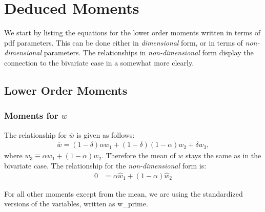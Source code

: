 \section{Deduced Moments}\label{sec:dedmoments}

We start by listing the equations for the lower order moments written in terms of \gls{pdf} parameters.
This can be done either in \emph{dimensional} form, or in terms of \emph{non-dimensional} parameters.
The relationships in \emph{non-dimensional} form display the connection to the bivariate case in a somewhat more clearly.

\subsection{Lower Order Moments}\label{subsec:lowerordermoments}

\subsubsection{Moments for $w$}\label{subsubsec:lowerordermoments_w}

The relationship for $\overline{w}$ is given as follows:
\begin{align}
    \label{eq:w_bar}
    \overline{w} = (1 - \delta) \alpha w_1 + (1 - \delta)(1-\alpha) w_2 + \delta w_3,
\end{align}
where $w_3 \equiv \alpha w_1 + (1 - \alpha) w_2$.
Therefore the mean of $w$ stays the same as in the bivariate case.
The relationship for the \emph{non-dimensional} form is:
\begin{align}
    \label{eq:w_bar_nondim}
    0 &= \alpha \widehat{w}_1 + (1 - \alpha) \widehat{w}_2
\end{align}

For all other moments except from the mean, we are using the standardized versions of the variables, written as \gls{w_prime}.

